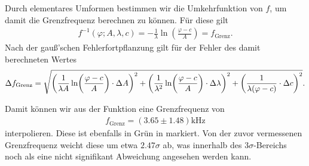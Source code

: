 Durch elementares Umformen bestimmen wir die Umkehrfunktion von $f$, um damit die Grenzfrequenz berechnen zu können. Für diese gilt
\begin{align}
  f^{-1}(\varphi; A, \lambda, c) = - \frac{1}{\lambda} \ln(\frac{\varphi - c}{A}) = f_{\mathrm{Grenz}}.
\end{align}
Nach der gauß'schen Fehlerfortpflanzung gilt für der Fehler des damit berechneten Wertes
\begin{align}
  \Delta f_{\mathrm{Grenz}} = \sqrt{\qty(\frac{1}{\lambda A} \ln(\frac{\varphi - c}{A}) \cdot \Delta A)^{2} + \qty(\frac{1}{\lambda^2} \ln(\frac{\varphi - c}{A}) \cdot \Delta \lambda)^{2} + \qty(\frac{1}{\lambda(\varphi - c)} \cdot \Delta c)^{2}}.
\end{align}

Damit können wir aus der Funktion eine Grenzfrequenz von
\begin{align}
  f_{\mathrm{Grenz}} = (3.65 \pm 1.48) \si{\kilo\hertz}
\end{align}
interpolieren. Diese ist ebenfalls in Grün in  markiert. Von der zuvor vermessenen Grenzfrequenz weicht diese um etwa $2.47\sigma$ ab, was innerhalb des $3\sigma$-Bereichs noch als eine nicht signifikant Abweichung angesehen werden kann.